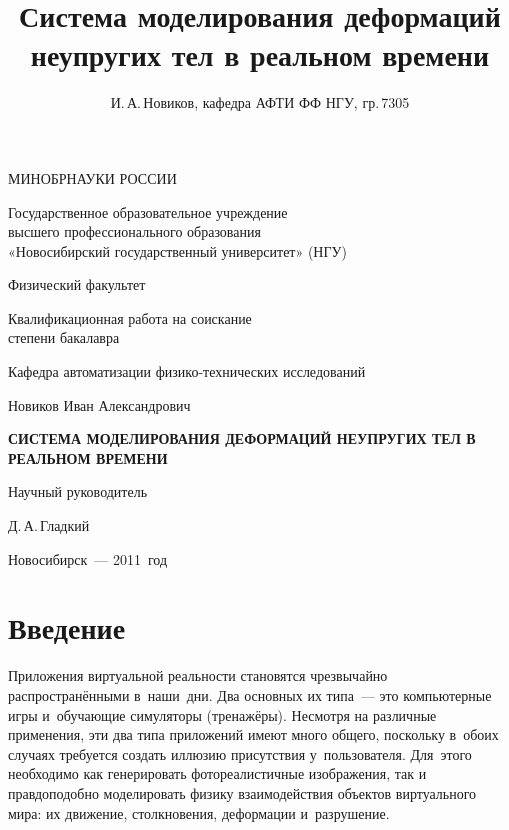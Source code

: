 \documentclass[a4paper, 14pt, titlepage]{extarticle}
\author{И.\,А.\,Новиков, кафедра АФТИ ФФ НГУ, гр.\,7305}
\title{Система моделирования деформаций неупругих тел в реальном времени}
\let\oldsection\section
\renewcommand{\section}{\newpage\oldsection}
\begin{document}

  \thispagestyle{empty}
  \begin {center}
  МИНОБРНАУКИ РОССИИ

  \vspace{0.3cm}

  Государственное образовательное учреждение\\
  высшего профессионального образования\\
  «Новосибирский государственный университет» (НГУ)

  \vspace{0.6cm}

  Физический факультет

  \vspace {2cm}

  Квалификационная работа на соискание\\
  степени бакалавра

  \vspace {0.5cm}

  Кафедра автоматизации физико-технических исследований

  \vspace {1cm}

  Новиков Иван Александрович

  \vspace {1.5cm}

  \textbf{СИСТЕМА МОДЕЛИРОВАНИЯ ДЕФОРМАЦИЙ НЕУПРУГИХ ТЕЛ В РЕАЛЬНОМ ВРЕМЕНИ}

  \vspace {2.5cm}

  \begin{flushright}

    Научный руководитель

    Д.\,А.\,Гладкий

  \end{flushright}

  \vspace {3cm}

  Новосибирск~--- 2011~год
  \end {center}


  \tableofcontents
  \newpage

  \section{Введение}

    Приложения виртуальной реальности становятся чрезвычайно рас\-прос\-тра\-нён\-ны\-ми в~наши~дни.  Два
    основных их типа~--- это компьютерные игры и~обучающие симуляторы (тренажёры). Несмотря на
    различные применения, эти два типа приложений имеют много общего, поскольку в~обоих случаях
    требуется создать иллюзию присутствия у~пользователя. Для~этого необходимо как генерировать
    фотореалистичные изображения, так и правдоподобно моделировать физику взаимодействия объектов
    виртуального мира: их движение, столкновения, деформации и~разрушение.
\end{document}
